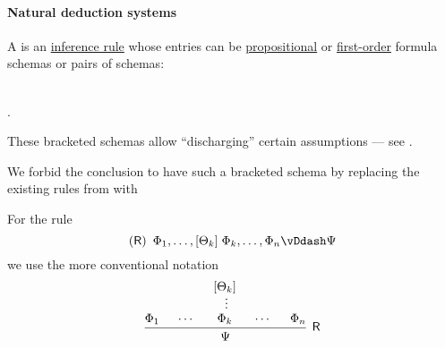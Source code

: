 \paragraph{Natural deduction systems}

\begin{definition}\label{def:natural_deduction_rule}\mimprovised
  A  is an \hyperref[def:inference_rule]{inference rule} whose entries can be \hyperref[def:propositional_formula_schema]{propositional} or \hyperref[def:first_order_formula_schema]{first-order} formula schemas or pairs of schemas:
  \begin{bnf*}
     { \bnfor} \\
    .
  \end{bnf*}

  These bracketed schemas allow \enquote{discharging} certain assumptions --- see .

  We forbid the conclusion to have such a bracketed schema by replacing the existing rules from  with
  \begin{bnf*}
     {}
  \end{bnf*}

  For the rule
  \begin{equation*}
    (\logic{R}) \enspace \Phi_1, \ldots, [\Theta_k] \thickspace \Phi_k, \ldots, \Phi_n \vDdash \Psi
  \end{equation*}
  we use the more conventional notation
  \begin{equation*}
    \begin{prooftree}
      \hypo{ \Phi_1 }
      \hypo{ \cdots }
      \hypo{ [\Theta_k] }
      \ellipsis {} { \Phi_k }
      \hypo{ \cdots }
      \hypo{ \Phi_n }
      \infer5[\logic{R}]{ \Psi }
    \end{prooftree}
  \end{equation*}
\end{definition}

